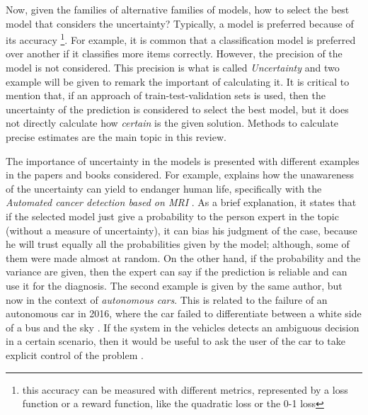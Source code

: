 \documentclass{article}
\begin{document}
Now, given the families of alternative families of models, how to select the best model that considers the uncertainty? Typically, a model is preferred because of its accuracy \footnote{this accuracy can be measured with different metrics, represented by a loss function or a reward function, like the quadratic loss or the 0-1 loss}. For example, it is common that a classification model is preferred over another if it classifies more items correctly. However, the precision of the model is not considered. This precision is what is called \textit{Uncertainty} and two example will be given to remark the important of calculating it. It is critical to mention that, if an approach of train-test-validation sets is used, then the uncertainty of the prediction is considered to select the best model, but it does not directly calculate how \textit{certain} is the given solution. Methods to calculate precise estimates are the main topic in this review.

The importance of uncertainty in the models is presented with different examples in the papers and books considered. For example, \cite{gal2016uncertainty} explains how the unawareness of the uncertainty can yield to endanger human life, specifically with the \textit{Automated cancer detection based on MRI} \cite{gal2016uncertainty}. As a brief explanation, it states that if the selected model just give a probability to the person expert in the topic (without a measure of uncertainty), it can bias his judgment of the case, because he will trust equally all the probabilities given by the model; although, some of them were made almost at random. On the other hand, if the probability and the variance are given, then the expert can say if the prediction is reliable and can use it for the diagnosis. The second example is given by the same author, but now in the context of \textit{autonomous cars}. This is related to the failure of an autonomous car in 2016, where the car failed to differentiate between a white side of a bus and the sky \cite{reuters}. If the system in the vehicles detects an ambiguous decision in a certain scenario, then it would be useful to ask the user of the car to take explicit control of the problem \cite{gal2016uncertainty}.
\end{document}
